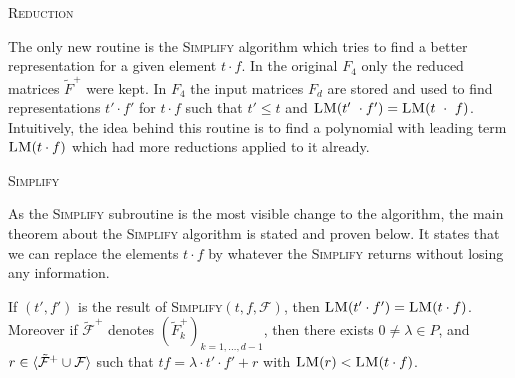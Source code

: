 \begin{algorithm}[ht]

\caption{\textsc{Reduction}} 
\label{alg:reduction}
\end{algorithm}

The only new routine is the \textsc{Simplify} algorithm which tries to find a better representation for a given element $t \cdot f$. In the original $F_{4}$ only the reduced matrices $\tilde{F}^+$ were kept. In $F_4$ the input matrices $F_d$ are stored and used to find representations $t' \cdot f'$ for $t \cdot f$ such that $t' \leq t$ and $\LM(t'\ \cdot f') = \LM(t\ \cdot\ f)$.  Intuitively, the idea behind this routine is to find a polynomial with leading term $\textsc{LM}(t \cdot f)$ which had more reductions applied to it already.

\begin{algorithm}[ht]

\caption{\textsc{Simplify}}
\label{alg:simplify}
\end{algorithm}

As the \textsc{Simplify} subroutine is the most visible change to the algorithm, the main theorem about the \textsc{Simplify} algorithm is stated and proven below. It states that we can replace the elements $t\cdot f$ by whatever the \textsc{Simplify} returns without losing any information.

\begin{lemma} \cite[p.10]{f4} If $(t',f')$ is the result of \textsc{Simplify}$(t,f,\mathcal{F})$, then $\textsc{LM}(t'\cdot f') = \textsc{LM}(t \cdot f)$. Moreover if $\tilde{\mathcal{F}}^+$ denotes $(\tilde{F}^+_k)_{k=1,\dots,d-1}$, then there exists $0 \not= \lambda \in P$, and $r \in \langle {\tilde{\mathcal{F}}^+ \cup \mathcal{F}} \rangle$ such that $tf = \lambda \cdot t' \cdot f' + r$ with $\textsc{LM}(r) < \textsc{LM}(t\cdot f)$. 
\end{lemma}

